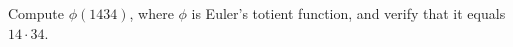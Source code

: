 Compute $\phi(1434)$, where $\phi$ is Euler's totient function, and verify that it equals $14\cdot34$.
